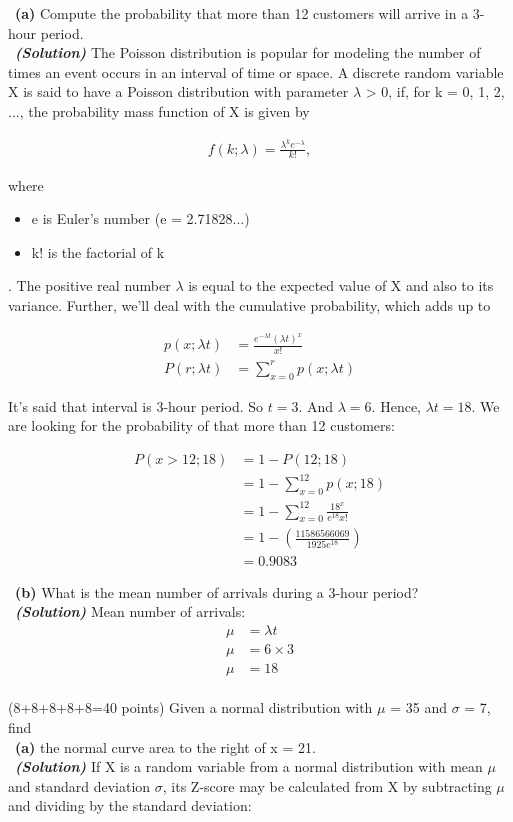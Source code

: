 \documentclass[a4 paper]{article}
\numberwithin{equation}{section}
\newcommand{\problem}[2]{~\\\fbox{\textbf{Problem #1}}\hfill (#2 points)\newline\newline}
\newcommand{\subproblem}[1]{~\newline\textbf{(#1)}}
\newcommand{\solution}{~\newline\textbf{\textit{(Solution)}} }
\newcommand{\0}{\mathbf{0}}
\begin{document}
\subproblem{a} Compute the probability that more than 12 customers will arrive in a 3-hour period.\\
\solution
The Poisson distribution is popular for modeling the number of times an event occurs in an interval of time or space. A discrete random variable X is said to have a Poisson distribution with parameter $\lambda$ > 0, if, for k = 0, 1, 2, ..., the probability mass function of X is given by

\begin{align*}
    f(k;\lambda) = \frac{\lambda^k e^{-\lambda}}{k!},
\end{align*}

where
\begin{itemize}
    \item e is Euler's number (e = 2.71828...)
    \item k! is the factorial of k
\end{itemize}.
The positive real number $\lambda$ is equal to the expected value of X and also to its variance. Further, we'll deal with the cumulative probability, which adds up to 

\begin{align*}
    p(x;\lambda t) &= \frac{e^{-\lambda t}(\lambda t)^x}{x!} \\
    P(r;\lambda t) &= \sum_{x=0}^{r}p(x;\lambda t)
\end{align*}

It's said that interval is 3-hour period. So $t=3$. And $\lambda = 6$. Hence, $\lambda t= 18$. We are looking for the probability of that more than 12 customers:

\begin{align*}
    P(x>12; 18) &= 1 - P(12;18) \\
    &= 1- \sum_{x=0}^{12}p(x;18) \\
    &= 1- \sum_{x=0}^{12} \frac{18^x}{e^{18}x!} \\
    &= 1- (\frac{11586566069}{1925e^{18}}) \\
    &= 0.9083
\end{align*}
\newline

\subproblem{b} What is the mean number of arrivals during a
3-hour period?\\
\solution
Mean number of arrivals:
\begin{align*}
    \mu &= \lambda t \\
    \mu &= 6\times 3 \\
    \mu &= 18
\end{align*}
\newline
\problem{3:}{8+8+8+8+8=40}
Given a normal distribution with $\mu$ = 35 and $\sigma$ = 7, find\\
\subproblem{a} the normal curve area to the right of x = 21.\\
\solution
If X is a random variable from a normal distribution with mean $\mu$ and standard deviation $\sigma$, its Z-score may be calculated from X by subtracting $\mu$ and dividing by the standard deviation: 
\end{document}
